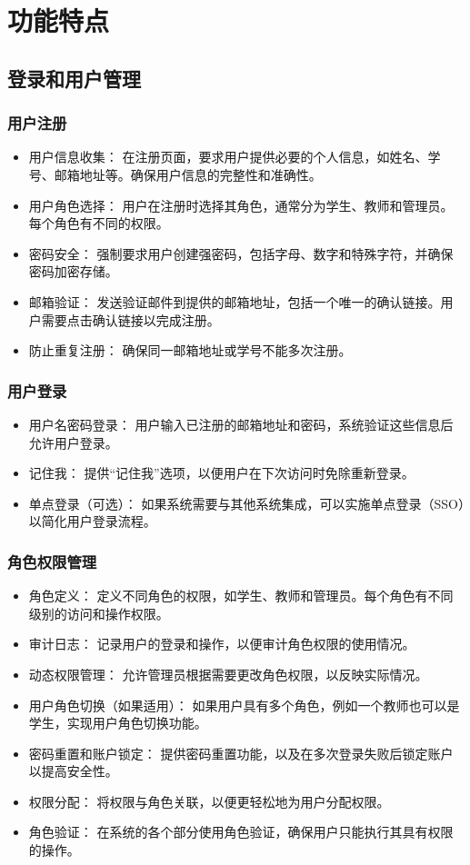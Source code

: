 \documentclass{article}
\begin{document}
\section{功能特点}

\subsection{登录和用户管理}
\subsubsection{用户注册}
\begin{itemize}
  \item 用户信息收集： 在注册页面，要求用户提供必要的个人信息，如姓名、学号、邮箱地址等。确保用户信息的完整性和准确性。
  \item 用户角色选择： 用户在注册时选择其角色，通常分为学生、教师和管理员。每个角色有不同的权限。
  \item 密码安全： 强制要求用户创建强密码，包括字母、数字和特殊字符，并确保密码加密存储。
  \item 邮箱验证： 发送验证邮件到提供的邮箱地址，包括一个唯一的确认链接。用户需要点击确认链接以完成注册。
  \item 防止重复注册： 确保同一邮箱地址或学号不能多次注册。
\end{itemize}

\subsubsection{用户登录}
\begin{itemize}
  \item 用户名密码登录： 用户输入已注册的邮箱地址和密码，系统验证这些信息后允许用户登录。
  \item 记住我： 提供“记住我”选项，以便用户在下次访问时免除重新登录。
  \item 单点登录（可选）： 如果系统需要与其他系统集成，可以实施单点登录（SSO）以简化用户登录流程。
\end{itemize}
\subsubsection{角色权限管理}
\begin{itemize}
  \item 角色定义： 定义不同角色的权限，如学生、教师和管理员。每个角色有不同级别的访问和操作权限。
  \item 审计日志： 记录用户的登录和操作，以便审计角色权限的使用情况。
  \item 动态权限管理： 允许管理员根据需要更改角色权限，以反映实际情况。
  \item 用户角色切换（如果适用）： 如果用户具有多个角色，例如一个教师也可以是学生，实现用户角色切换功能。
  \item 密码重置和账户锁定： 提供密码重置功能，以及在多次登录失败后锁定账户以提高安全性。
  \item 权限分配： 将权限与角色关联，以便更轻松地为用户分配权限。
  \item 角色验证： 在系统的各个部分使用角色验证，确保用户只能执行其具有权限的操作。
\end{itemize}
\end{document}
